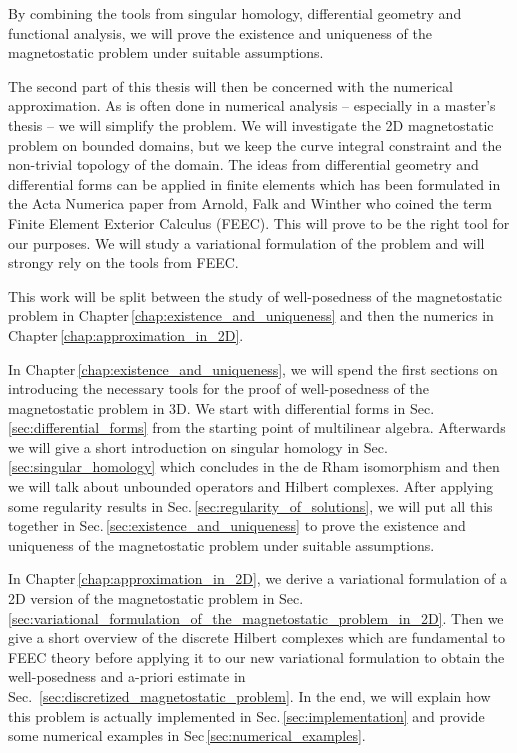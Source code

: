 \documentclass[../master_thesis.tex]{subfiles}
\begin{document}
By combining the tools from singular homology, differential geometry and 
functional analysis, we will prove the existence and uniqueness of the magnetostatic problem 
under suitable assumptions.

The second part of this thesis will then be concerned with the numerical approximation. 
As is often done in numerical analysis -- especially in a master's thesis -- we 
will simplify the problem. We will investigate the 2D magnetostatic problem on bounded domains, 
but we keep the curve integral 
constraint and the non-trivial topology of the domain. The ideas from differential geometry and 
differential forms can be applied in finite elements
which has been formulated in the Acta Numerica paper from Arnold, Falk and Winther 
\cite{arnold_falk_winther} who coined the term Finite Element Exterior Calculus (FEEC). This will prove to 
be the right tool for our purposes. We will study a variational formulation of the problem 
and will strongy rely on the tools from FEEC.


This work will be split between the study of well-posedness of the magnetostatic problem 
in Chapter\,\ref{chap:existence_and_uniqueness} and then the numerics in Chapter\,\ref{chap:approximation_in_2D}.

In Chapter\,\ref{chap:existence_and_uniqueness}, we will spend the first sections on 
introducing the necessary tools for the proof of well-posedness of the magnetostatic problem 
in 3D. We start with differential forms in Sec.\,\ref{sec:differential_forms} from the starting point 
of multilinear algebra. Afterwards we will give a short introduction on 
singular homology in Sec.\,\ref{sec:singular_homology} which concludes in the de Rham isomorphism and then 
we will talk about unbounded operators and Hilbert 
complexes. After applying some regularity results in Sec.\,\ref{sec:regularity_of_solutions},
we will put all this together in Sec.\,\ref{sec:existence_and_uniqueness} to prove the existence and uniqueness 
of the magnetostatic problem under suitable assumptions.

In Chapter\,\ref{chap:approximation_in_2D}, we derive a variational formulation of a 2D version of the 
magnetostatic problem in Sec.\,\ref{sec:variational_formulation_of_the_magnetostatic_problem_in_2D}. Then we give a short overview of the discrete Hilbert complexes 
which are fundamental to FEEC theory before applying it to our new variational formulation 
to obtain the well-posedness and a-priori estimate in Sec.~\ref{sec:discretized_magnetostatic_problem}. 
In the end, we will explain how this 
problem is actually implemented in Sec.\,\ref{sec:implementation} 
and provide some numerical examples in Sec\,\ref{sec:numerical_examples}.
\end{document}
